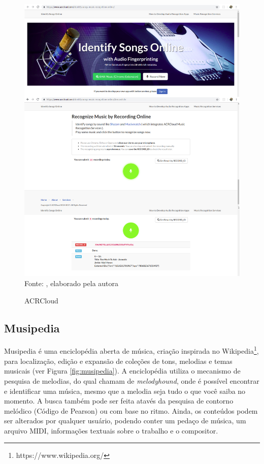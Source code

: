 \begin{figure}[!htb]
   \centering
   \caption{ACRCloud}\label{fig:acrcloud} 
   \includegraphics[scale=0.30]{figuras/acrcloud.png}
   \\Fonte: \cite{acrcloudSite}, elaborado pela autora
\end{figure}


\subsection{Musipedia} \label{subsec:musipedia}
Musipedia é uma enciclopédia aberta de música, criação inspirada no Wikipedia\footnote{https://www.wikipedia.org/}, para localização, edição e expansão de coleções de tons, melodias e temas musicais (ver Figura \ref{fig:musipedia}). A enciclopédia utiliza o mecanismo de pesquisa de melodias, do qual chamam de \textit{melodyhound}, onde é possível encontrar e identificar uma música, mesmo que a melodia seja tudo o que você saiba no momento. A busca também pode ser feita atavés da pesquisa de contorno melódico (Código de Pearson) ou com base no ritmo. Ainda, os conteúdos podem ser alterados por qualquer usuário, podendo conter um pedaço de música, um arquivo MIDI, informações textuais sobre o trabalho e o compositor.

